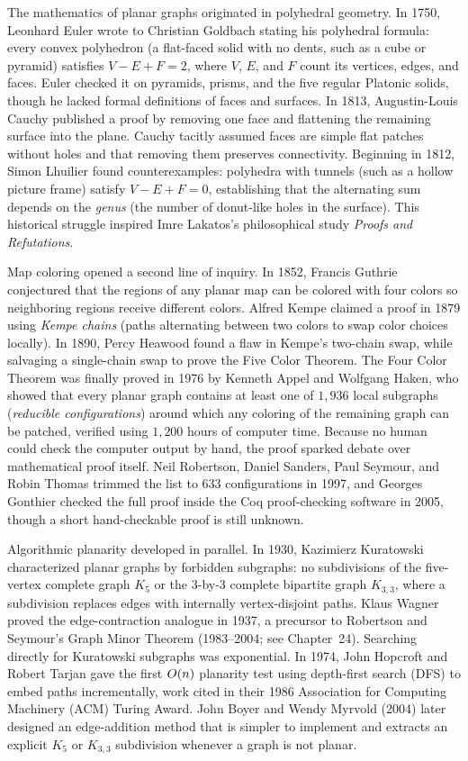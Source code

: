 \begin{historybox}
The mathematics of planar graphs originated in polyhedral geometry. In 1750, Leonhard
Euler wrote to Christian Goldbach stating his polyhedral formula: every convex polyhedron
(a flat-faced solid with no dents, such as a cube or pyramid) satisfies $V - E + F = 2$,
where $V$, $E$, and $F$ count its vertices, edges, and faces. Euler checked it on pyramids,
prisms, and the five regular Platonic solids, though he lacked formal definitions of faces
and surfaces. In 1813, Augustin-Louis Cauchy published a proof by removing one face and
flattening the remaining surface into the plane. Cauchy tacitly assumed faces are simple
flat patches without holes and that removing them preserves connectivity. Beginning in 1812,
Simon Lhuilier found counterexamples: polyhedra with tunnels (such as a hollow picture frame)
satisfy $V - E + F = 0$, establishing that the alternating sum depends on the \emph{genus}
(the number of donut-like holes in the surface). This historical struggle inspired Imre
Lakatos's philosophical study \emph{Proofs and Refutations}.

Map coloring opened a second line of inquiry. In 1852, Francis Guthrie conjectured that the
regions of any planar map can be colored with four colors so neighboring regions receive
different colors. Alfred Kempe claimed a proof in 1879 using \emph{Kempe chains} (paths
alternating between two colors to swap color choices locally). In 1890, Percy Heawood found
a flaw in Kempe's two-chain swap, while salvaging a single-chain swap to prove the Five
Color Theorem. The Four Color Theorem was finally proved in 1976 by Kenneth Appel and
Wolfgang Haken, who showed that every planar graph contains at least one of $1{,}936$ local
subgraphs (\emph{reducible configurations}) around which any coloring of the remaining graph
can be patched, verified using $1{,}200$ hours of computer time. Because no human could
check the computer output by hand, the proof sparked debate over mathematical proof itself.
Neil Robertson, Daniel Sanders, Paul Seymour, and Robin Thomas trimmed the list to $633$
configurations in 1997, and Georges Gonthier checked the full proof inside the Coq
proof-checking software in 2005, though a short hand-checkable proof is still unknown.

Algorithmic planarity developed in parallel. In 1930, Kazimierz Kuratowski characterized
planar graphs by forbidden subgraphs: no subdivisions of the five-vertex complete graph
$K_5$ or the $3$-by-$3$ complete bipartite graph $K_{3,3}$, where a subdivision replaces
edges with internally vertex-disjoint paths. Klaus Wagner proved the edge-contraction
analogue in 1937, a precursor to Robertson and Seymour's Graph Minor Theorem (1983--2004;
see Chapter~24). Searching directly for Kuratowski subgraphs was exponential. In 1974, John
Hopcroft and Robert Tarjan gave the first $O(n)$ planarity test using depth-first search
(DFS) to embed paths incrementally, work cited in their 1986 Association for Computing
Machinery (ACM) Turing Award. John Boyer and Wendy Myrvold (2004) later designed an
edge-addition method that is simpler to implement and extracts an explicit $K_5$ or
$K_{3,3}$ subdivision whenever a graph is not planar.
\end{historybox}

